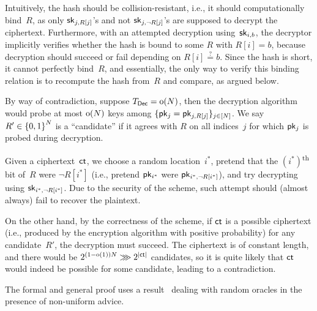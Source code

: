 Intuitively, the hash should be collision-resistant, i.e., it should computationally bind~$R$, as only $\sk_{j,R[j]}$'s and not $\sk_{j,\neg R[j]}$'s are supposed to decrypt the ciphertext.
Furthermore, with an attempted decryption using~$\sk_{i,b}$,
the decryptor implicitly verifies whether the hash is bound to some $R$ with ${R[i]=b}$, because decryption should succeed or fail depending on ${R[i]\overset{?}{=}b}$.
Since the hash is short, it cannot perfectly bind~$R$, and essentially, the only way to verify this binding relation is to recompute the hash from~$R$ and compare, as argued below.

By way of contradiction, suppose ${\TDec=\smallo(N)}$, then
the decryption algorithm would probe at most $\operatorname{o}(N)$ keys among ${\{\pk_j=\pk_{j,R[j]}\}_{j\in[N]}}$.
We say ${R'\in{\{0,1\}}^N}$ is a ``candidate'' if it agrees with $R$ on all indices~$j$ for which $\pk_j$ is probed during decryption.

Given a ciphertext~$\ct$, we choose a random location~$i^\ast$,
pretend that the $(i^\ast)$\textsuperscript{th} bit of~$R$ were ${\neg R[i^\ast]}$ (i.e., pretend $\pk_{i^\ast}$ were $\pk_{i^\ast,\neg R[i^\ast]}$), and try decrypting using $\sk_{i^\ast,\neg R[i^\ast]}$.
Due to the security of the scheme, such attempt should (almost always) fail to recover the plaintext.

On the other hand, by the correctness of the scheme, if $\ct$ is a possible ciphertext (i.e., produced by the encryption algorithm with positive probability) for any candidate~$R'$, the decryption must succeed.
The ciphertext is of constant length, and there would be ${2^{(1-\smallo(1))N}\ggg 2^{|\ct|}}$ candidates, so it is quite likely that $\ct$ would indeed be possible for some candidate, leading to a contradiction.

The formal and general proof uses a result~\cite{C:Unruh07} dealing with random oracles in the presence of non-uniform advice.

